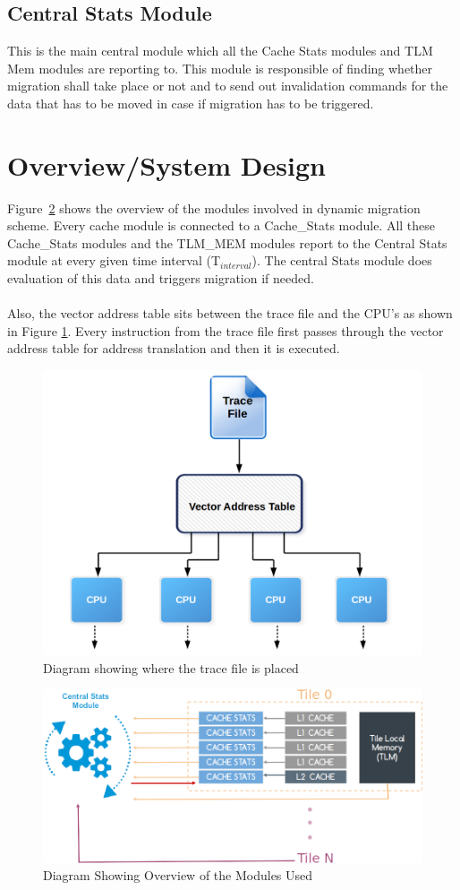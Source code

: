 \documentclass{listhesis}
\begin{document}
\subsection{Central Stats Module}
This is the main central module which all the Cache Stats modules and TLM Mem modules are reporting to. This module is responsible of finding whether migration shall take place or not and to send out invalidation commands for the data that has to be moved in case if migration has to be triggered. 

\section{Overview/System Design}
Figure~\ref{fig:overviewOfSolution} shows the overview of the modules involved in dynamic migration scheme. Every cache module is connected to a Cache{\_}Stats module. All these Cache{\_}Stats modules and the TLM{\_}MEM modules report to the Central Stats module at every given time interval (T$_{interval}$). The central Stats module does evaluation of this data and triggers migration if needed. \\
\\
Also, the vector address table sits between the trace file and the CPU's as shown in Figure \ref{fig:traceFile}. Every instruction from the trace file first passes through the vector address table for address translation and then it is executed.

\begin{figure}[h!]
  \includegraphics[width=0.7\linewidth]{traceFile.png}
  \centering
  \caption{Diagram showing where the trace file is placed}
  \label{fig:traceFile}
\end{figure}

\begin{figure}
  \includegraphics[width=\linewidth]{moduleconnections.png}
  \centering
  \caption{Diagram Showing Overview of the Modules Used}
  \label{fig:overviewOfSolution}
\end{figure}
\end{document}
